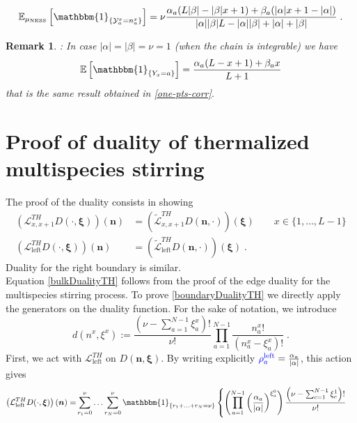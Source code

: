 \documentclass[10pt]{article}
\numberwithin{equation}{section}
\numberwithin{equation}{subsection}
\newtheorem{remark}{Remark}
\newcommand{\dt}{\;.}
\newcommand{\fra}[1]{\textcolor[rgb]{0,0,1}{#1}}
\begin{document}
{\begin{equation}
	\mathbb{E}_{\mu_{\text{NESS}}}\left[\mathbbm{1}_{\{\mathcal{Y}_{a}^{x}=n_{a}^{x}\}}\right]=\nu\frac{\alpha_{a}(L|\beta|-|\beta|x+1)+\beta_{a}(|\alpha|x+1-|\alpha|)}{|\alpha||\beta|L-|\alpha||\beta|+|\alpha|+|\beta|}\dt
\end{equation}
\begin{remark}: In case $|\alpha|=|\beta|=\nu=1$ (when the chain is integrable) we have 
\begin{equation}
		\mathbb{E}\left[\mathbbm{1}_{\{Y_{x}=a\}}\right]=\frac{\alpha_{a}(L-x+1)+\beta_{a}x}{L+1}
\end{equation}
that is the same result obtained in \eqref{one-pts-corr}.  
\end{remark}

\section{Proof of duality of thermalized multispecies stirring}\label{appendix-dualityThermalized}
The proof of the duality consists in showing
\begin{align}
	\left(\mathcal{L}_{x,x+1}^{TH}D(\cdot,\bm{\xi})\right)(\bm{n})&=\left(\widetilde{\mathcal{L}}_{x,x+1}^{TH}D(\bm{n},\cdot)\right)(\bm{\xi})\qquad x\in \{1,\ldots,L-1\}\label{bulkDualityTH}\\
	\left(\mathcal{L}_{\text{left}}^{TH}D(\cdot,\bm{\xi})\right)(\bm{n})&=\left(\widetilde{\mathcal{L}}_{\text{left}}^{TH}D(\bm{n},\cdot)\right)(\bm{\xi})\dt\label{boundaryDualityTH}
\end{align}
Duality for the right boundary is similar. \\
Equation \eqref{bulkDualityTH} follows from the proof of the edge duality for the multispecies stirring process. To prove \eqref{boundaryDualityTH} we directly apply the generators on the duality function. For the sake of notation, we introduce 
\begin{equation}
	d(n^{x},\xi^{x}):=\frac{(\nu-\sum_{a=1}^{N-1}\xi_{a}^{x})!}{\nu!}\prod_{a=1}^{N-1}\frac{n_{a}^{x}!}{(n_{a}^{x}-\xi_{a}^{x})!}\dt
\end{equation}
First, we act with $\mathcal{L}_{\text{left}}^{TH}$ on $D(\bm{n},\bm{\xi})$. By writing explicitly $\fra{\rho_{a}^{\text{left}}}=\frac{\alpha_{a}}{|\alpha|}$, this action gives
\begin{align}\label{ProvaBordoTH}
	\left(\mathcal{L}_{\text{left}}^{TH}D(\cdot,\bm{\xi})\right)(\bm{n})=\nonumber&\sum_{r_{1}=0}^{\nu}\ldots\sum_{r_{N}=0}^{\nu}\mathbbm{1}_{\{r_{1}+\ldots+r_{N}=\nu\}}\left\{\left(\prod_{a=1}^{N-1}\left(\frac{\alpha_{a}}{|\alpha|}\right)^{\xi_{a}^{0}}\right)\frac{\left(\nu-\sum_{c=1}^{N-1}\xi_{c}^{1}\right)!}{\nu!}\right.

\end{align}}
\end{document}
